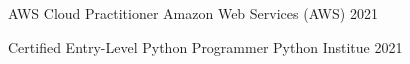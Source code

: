 

\begin{cvhonors}

  \cvhonor
    {AWS Cloud Practitioner} %
    {Amazon Web Services (AWS)} %
    {} %
    {2021} %

  \cvhonor
    {Certified Entry-Level Python Programmer} %
    {Python Institue} %
    {} %
    {2021} %

\end{cvhonors}
